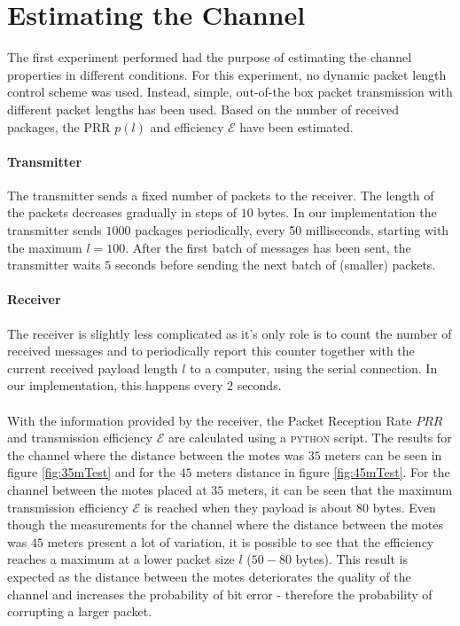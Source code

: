 \section{Estimating the Channel
\label{sec:chanEst}}

The first experiment performed had the purpose of estimating the channel properties in different conditions. For this experiment, no dynamic packet length control scheme was used. Instead, simple, out-of-the box packet transmission  with different packet lengths has been used. Based on the number of received packages, the PRR $p(l)$ and efficiency $\mathcal{E}$ have been estimated.

\paragraph{Transmitter} The transmitter sends a fixed number of packets to the receiver. The length of the packets decreases gradually in steps of $10$ bytes. In our implementation the transmitter sends $1000$ packages periodically, every 50 milliseconds, starting with the maximum $l = 100$. After the first batch of messages has been sent, the transmitter waits $5$ seconds before sending the next batch of (smaller) packets.

\paragraph{Receiver} The receiver is slightly less complicated as it's only role is to count the number of received messages and to periodically report this counter together with the current received payload length $l$ to a computer, using the serial connection. In our implementation, this happens every $2$ seconds.

\paragraph{}With the information provided by the receiver, the Packet Reception Rate $PRR$ and transmission efficiency $\mathcal{E}$ are calculated using a \textsc{python} script. The results for the channel where the distance between the motes was $35$ meters can be seen in figure \ref{fig:35mTest} and for the $45$ meters distance in figure \ref{fig:45mTest}. For the channel between the motes placed at $35$ meters, it can be seen that the maximum transmission efficiency $\mathcal{E}$ is reached when they payload is about $80$ bytes. Even though the measurements for the channel where the distance between the motes was $45$ meters present a lot of variation, it is possible to see that the efficiency reaches a maximum at a lower packet size $l$ ($50-80$ bytes). This result is expected as the distance between the motes deteriorates the quality of the channel and increases the probability of bit error - therefore the probability of corrupting a larger packet.

